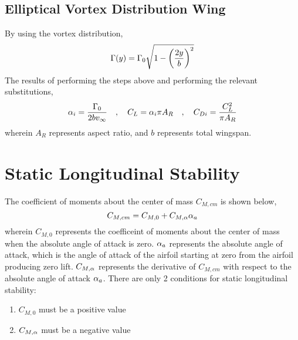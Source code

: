 \documentclass[class=report, 12pt, crop=false]{standalone}
\begin{document}
\begin{center}
\subsection{Elliptical Vortex Distribution Wing}
\begin{comment}
\end{comment}
By using the vortex distribution,
$$\Gamma(y) = \Gamma_0\sqrt{\displaystyle{1-\left(\frac{2y}{b}\right)^2}}$$
The results of performing the steps above and performing the relevant substitutions,
$$\alpha_i = \frac{\Gamma_0}{2bv_\infty} \quad,\quad C_L = \alpha_i \pi A_R \quad,\quad C_{Di} = \frac{C_L^2}{\pi A_R}$$
wherein $A_R$ represents aspect ratio, and $b$ represents total wingspan.
\section{Static Longitudinal Stability}
\begin{comment}
\end{comment}
The coefficient of moments about the center of mass $C_{M,cm}$ is shown below,
$$C_{M,cm} = C_{M,0} + C_{M,\alpha}\alpha_a$$
wherein $C_{M,0}$ represents the coefficeint of moments about the center of mass when the absolute angle of attack is zero. $\alpha_a$ represents the absolute angle of attack, which is the angle of attack of the airfoil starting at zero from the airfoil producing zero lift. $C_{M,\alpha}$ represents the derivative of $C_{M,cm}$ with respect to the absolute angle of attack $\alpha_a$. There are only 2 conditions for static longitudinal stability:
\begin{enumerate}
\centering
\item $C_{M,0}$ must be a positive value 
\item $C_{M,\alpha}$ must be a negative value
\end{enumerate}
\end{center}
\end{document}
